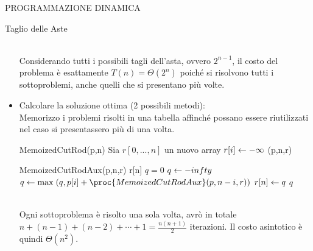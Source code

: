 \documentclass[8pt]{extarticle}
\begin{document}
\begin{formulario}
\begin{myParagraph}{PROGRAMMAZIONE DINAMICA}
\begin{subParagraph}{Taglio delle Aste}
\begin{itemize}
				\\
				Considerando tutti i possibili tagli dell'asta, ovvero $2^{n-1}$, il costo del problema è esattamente $T(n)=\Theta(2^n)$ poiché si risolvono tutti i sottoproblemi, anche quelli che si presentano più volte. 
				\item Calcolare la soluzione ottima (2 possibili metodi):\\
Memorizzo i problemi risolti in una tabella affinché possano essere riutilizzati nel caso si presentassero più di una volta.
				\begin{code}{MemoizedCutRod(p,n)}
\li Sia $r[0,...,n]$ un nuovo array
\li {}
	\li $r[i] \leftarrow -\infty$
\END
\li \RETURN {} (p,n,r)
				\end{code}
				\begin{code}{MemoizedCutRodAux(p,n,r)}
\li {}
	\li \RETURN r[n]
\END
\li {}
	\li $q=0$
\li \ELSE
	\li $q \leftarrow -infty$
	\li {}
		\li $q \get \max\;(q, p[i]+\proc{MemoizedCutRodAux}(p, n-i, r))$
	\END
\END
\li $r[n] \leftarrow q$
\li \RETURN $q$
				\end{code}
\\
Ogni sottoproblema è risolto una sola volta, avrò in totale $n+(n-1)+(n-2)+\cdots+1=\frac{n(n+1)}{2}$ iterazioni. Il costo asintotico è quindi $\Theta(n^2)$.
\end{itemize}
\end{subParagraph}
\end{myParagraph}
\end{formulario}
\end{document}

